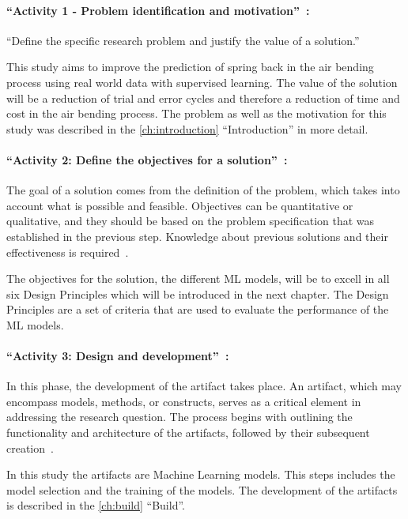 \paragraph{``Activity 1 - Problem identification and motivation''~\cite[p. 52]{peffers_designscienceresearch_2007}:}
``Define the specific research problem and justify the value of a solution.''
~\cite[p. 52]{peffers_designscienceresearch_2007}

This study aims to improve the prediction of spring back in the air bending process using real world
data with supervised learning.
The value of the solution will be a reduction of trial and error cycles and therefore a reduction of time and cost in
the air bending process.
The problem as well as the motivation for this study was described in the \cref{ch:introduction}
``Introduction'' in more detail.

\paragraph{``Activity 2: Define the objectives for a solution''~\cite[p. 55]{peffers_designscienceresearch_2007}:}
The goal of a solution comes from the definition of the problem, which takes into account what is possible and feasible.
Objectives can be quantitative or qualitative, and they should be based on the problem specification that was
established in the previous step.
Knowledge about previous solutions and their effectiveness is required~\cite[p. 55]{peffers_designscienceresearch_2007}.

The objectives for the solution, the different \ac{ML} models, will be to excell in all six Design Principles which
will be introduced in the next chapter.
The Design Principles are a set of criteria that are used to evaluate the performance of the \ac{ML} models.

\paragraph{``Activity 3: Design and development''~\cite[p. 55]{peffers_designscienceresearch_2007}:}
In this phase, the development of the artifact takes place.
An artifact, which may encompass models, methods, or constructs, serves as a critical element in addressing the
research question.
The process begins with outlining the functionality and architecture of the artifacts, followed by their subsequent
creation~\cite[p. 55]{peffers_designscienceresearch_2007}.

In this study the artifacts are Machine Learning models.
This steps includes the model selection and the training of the models.
The development of the artifacts is described in the \cref{ch:build} ``Build''.

